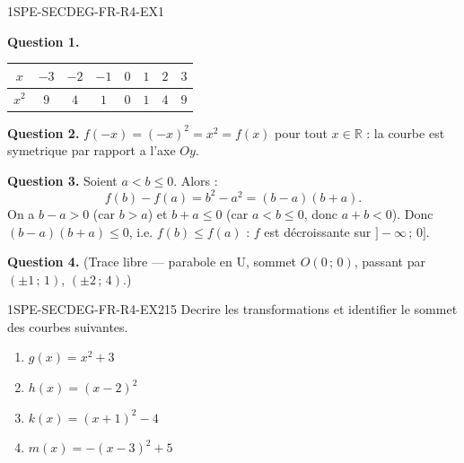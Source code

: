 \begin{corrige}{1SPE-SECDEG-FR-R4-EX1}

\textbf{Question 1.}

\begin{center}
\begin{tabular}{|c|c|c|c|c|c|c|c|}
\hline
$x$ & $-3$ & $-2$ & $-1$ & $0$ & $1$ & $2$ & $3$ \\
\hline
$x^2$ & $9$ & $4$ & $1$ & $0$ & $1$ & $4$ & $9$ \\
\hline
\end{tabular}
\end{center}

\textbf{Question 2.} $f(-x) = (-x)^2 = x^2 = f(x)$ pour tout $x \in \mathbb{R}$ : la courbe est symetrique par rapport a l'axe $Oy$.

\textbf{Question 3.} Soient $a < b \leq 0$. Alors :
\[
f(b) - f(a) = b^2 - a^2 = (b-a)(b+a).
\]
On a $b - a > 0$ (car $b > a$) et $b + a \leq 0$ (car $a < b \leq 0$, donc $a + b < 0$). Donc $(b-a)(b+a) \leq 0$, i.e. $f(b) \leq f(a)$ : $f$ est décroissante sur $]-\infty\,;\,0]$.

\textbf{Question 4.} (Trace libre — parabole en U, sommet $O(0\,;\,0)$, passant par $(\pm 1\,;\,1)$, $(\pm 2\,;\,4)$.)

\end{corrige}


\begin{exercice}{1SPE-SECDEG-FR-R4-EX2}{1}{5}
Decrire les transformations et identifier le sommet des courbes suivantes.
\begin{enumerate}
  \item $g(x) = x^2 + 3$
  \item $h(x) = (x-2)^2$
  \item $k(x) = (x+1)^2 - 4$
  \item $m(x) = -(x-3)^2 + 5$
\end{enumerate}
\end{exercice}


